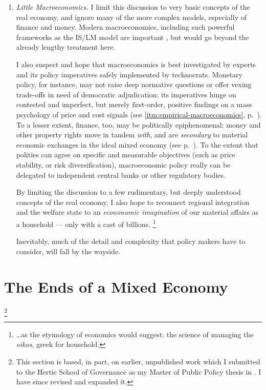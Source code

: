 \begin{enumerate}
	\item \label{itm:little-macroeconomics} \emph{Little Macroeconomics.}
	I limit this discussion to very basic concepts of the real economy, and ignore many of the more complex models, especially of finance and money.
	Modern macroeconomics, including such powerful frameworks as the IS/LM model are important \citep[originally][]{Hicks1937}, but would go beyond the already lengthy treatment here.

	I also suspect and hope that macroeconomics is best investigated by experts and its policy imperatives safely implemented by technocrats.
	Monetary policy, for instance, may not raise deep normative questions or offer vexing trade-offs in need of democratic adjudication:
	its imperatives hinge on contested and imperfect, but merely first-order, positive findings on a mass psychology of price and cost signals (see \autoref{itm:empirical-macroeconomics}, p.~\pageref{itm:empirical-macroeconomics}).
	To a lesser extent, finance, too, may be politically epiphenomenal:
	money and other property rights move in tandem \emph{with}, and are \emph{secondary} to material economic exchanges in the ideal mixed economy (see p.~\pageref{itm:epiphenomenal-finance}).
	To the extent that polities can agree on specific and measurable objectives (such as price stability, or risk diversification), macroeconomic policy really can be delegated to independent central banks or other regulatory bodies.

	By limiting the discussion to a few rudimentary, but deeply understood concepts of the real economy, I also hope to reconnect regional integration and the welfare state to an \emph{econonomic imagination} \citep[paraphrasing][]{Mills-1959-aa} of our material affairs as a household --- only with a cast of billions.
	\footnote{
		\ldots as the etymology of economics would suggest:
		the science of managing the \emph{oikos}, greek for household.
	}

	Inevitably, much of the detail and complexity that policy makers have to consider, will fall by the wayside.
\end{enumerate}

\section[Ends]{The Ends of a Mixed Economy}
	\label{sec:ends}

\footnote{\label{fn:also-in-mpp}
	This section is based, in part, on earlier, unpublished work which I submitted to the Hertie School of Governance as my Master of Public Policy thesis in \citep{Held2010a}.
	I have since revised and expanded it.
}

